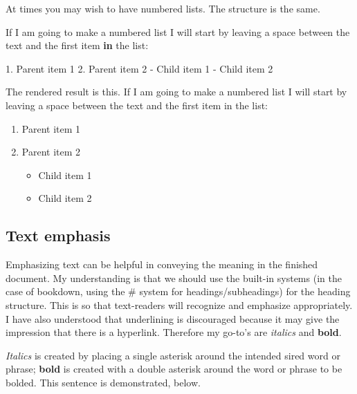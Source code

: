 \documentclass[
]{book}
\newenvironment{Shaded}{\begin{snugshade}}{\end{snugshade}}
\newcommand{\ControlFlowTok}[1]{\textcolor[rgb]{0.13,0.29,0.53}{\textbf{#1}}}
\newcommand{\DecValTok}[1]{\textcolor[rgb]{0.00,0.00,0.81}{#1}}
\newcommand{\FloatTok}[1]{\textcolor[rgb]{0.00,0.00,0.81}{#1}}
\newcommand{\NormalTok}[1]{#1}
\newcommand{\SpecialCharTok}[1]{\textcolor[rgb]{0.00,0.00,0.00}{#1}}
\providecommand{\tightlist}{%
  \setlength{\itemsep}{0pt}\setlength{\parskip}{0pt}}
\begin{document}
At times you may wish to have numbered lists. The structure is the same.

\begin{Shaded}
\begin{Highlighting}[]
\NormalTok{If I am going to make a numbered list I will start by leaving a space between the text and the first item }\ControlFlowTok{in}\NormalTok{ the list}\SpecialCharTok{:}
  
\FloatTok{1.}\NormalTok{ Parent item }\DecValTok{1}
\FloatTok{2.}\NormalTok{ Parent item }\DecValTok{2}
   \SpecialCharTok{{-}}\NormalTok{ Child item }\DecValTok{1}
   \SpecialCharTok{{-}}\NormalTok{ Child item }\DecValTok{2}
\end{Highlighting}
\end{Shaded}

The rendered result is this. If I am going to make a numbered list I will start by leaving a space between the text and the first item in the list:

\begin{enumerate}
\def\labelenumi{\arabic{enumi}.}
\tightlist
\item
  Parent item 1
\item
  Parent item 2

  \begin{itemize}
  \tightlist
  \item
    Child item 1
  \item
    Child item 2
  \end{itemize}
\end{enumerate}

\hypertarget{text-emphasis}{%
\subsection{Text emphasis}\label{text-emphasis}}

Emphasizing text can be helpful in conveying the meaning in the finished document. My understanding is that we should use the built-in systems (in the case of bookdown, using the \# system for headings/subheadings) for the heading structure. This is so that text-readers will recognize and emphasize appropriately. I have also understood that underlining is discouraged because it may give the impression that there is a hyperlink. Therefore my go-to's are \emph{italics} and \textbf{bold}.

\emph{Italics} is created by placing a single asterisk around the intended sired word or phrase; \textbf{bold} is created with a double asterisk around the word or phrase to be bolded. This sentence is demonstrated, below.
\end{document}
